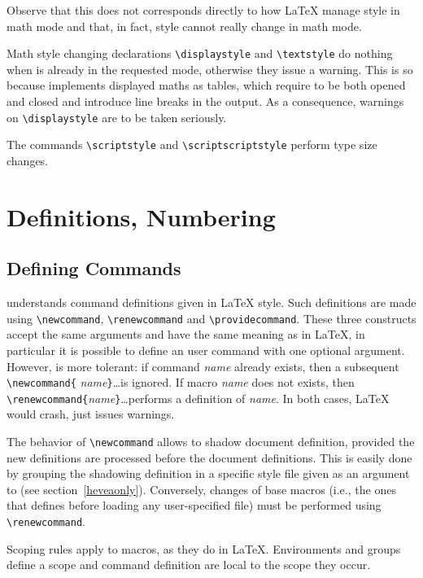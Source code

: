 Observe that this does not corresponds directly to how \LaTeX{} manage style
in math mode and that, in fact, style cannot really change in math mode.

Math style changing declarations \verb+\displaystyle+ and
\verb+\textstyle+ do nothing when \hevea{} is already in the requested
mode,
otherwise they issue a warning.
This is so because \hevea{} implements displayed maths as tables,
which require to be both opened and closed and introduce line breaks
in the output.
As a consequence, warnings on \verb+\displaystyle+ are to be taken seriously.


The commands \verb+\scriptstyle+ and \verb+\scriptscriptstyle+
perform type size changes.

\section{Definitions, Numbering}

\subsection{Defining Commands}\label{usermacro}

\hevea{} understands command definitions given in \LaTeX{} style. Such
definitions are made using
\verb+\newcommand+, \verb+\renewcommand+ and \verb+\providecommand+.
These three constructs accept the same arguments and have the same
meaning as in \LaTeX{}, in particular it is possible to define an user
command with one optional argument.
However, \hevea{} is more tolerant: if command
{\it name} already exists, then a subsequent \verb+\newcommand{+{\it
name}\verb+}+\ldots is ignored.  If macro {\it name} does not exists, then
\verb+\renewcommand{+{\it name}\verb+}+\ldots performs{} a definition of {\it
name}.  In both cases, \LaTeX{} would crash, \hevea{} just issues
warnings.

The behavior of \verb+\newcommand+ allows to shadow document
definition, provided the new definitions are processed before the
document definitions.
This is easily done by grouping the shadowing definition  in a
specific style file given as an argument to \hevea{} (see section~\ref{heveaonly}).
Conversely, changes of base macros (i.e., the ones that \hevea{}
defines before loading any user-specified file) must be performed
using \verb+\renewcommand+.



Scoping rules apply to macros, as they do in \LaTeX{}.
Environments and groups define a scope and command definition
are local to the scope they occur.

